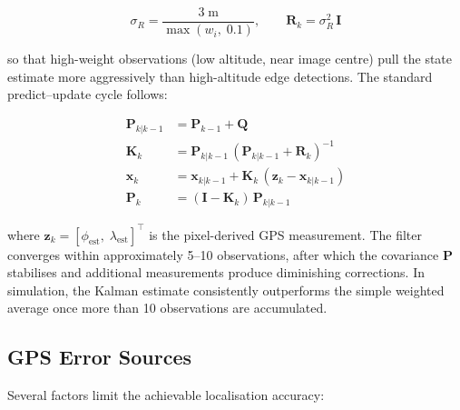 \begin{equation}\label{eq:kalman-R}
  \sigma_R = \frac{3\;\text{m}}{\max(w_i,\; 0.1)}, \qquad
  \mathbf{R}_k = \sigma_R^2\,\mathbf{I}
\end{equation}

\noindent so that high-weight observations (low altitude, near image centre) pull the state estimate more aggressively than high-altitude edge detections. The standard predict--update cycle follows:

\begin{align}
  \mathbf{P}_{k|k-1} &= \mathbf{P}_{k-1} + \mathbf{Q} \label{eq:kalman-predict}\\
  \mathbf{K}_k &= \mathbf{P}_{k|k-1}\,(\mathbf{P}_{k|k-1} + \mathbf{R}_k)^{-1} \label{eq:kalman-gain}\\
  \mathbf{x}_k &= \mathbf{x}_{k|k-1} + \mathbf{K}_k\,(\mathbf{z}_k - \mathbf{x}_{k|k-1}) \label{eq:kalman-update}\\
  \mathbf{P}_k &= (\mathbf{I} - \mathbf{K}_k)\,\mathbf{P}_{k|k-1} \label{eq:kalman-cov}
\end{align}

\noindent where $\mathbf{z}_k = [\phi_\mathrm{est},\;\lambda_\mathrm{est}]^\top$ is the pixel-derived GPS measurement. The filter converges within approximately 5--10 observations, after which the covariance $\mathbf{P}$ stabilises and additional measurements produce diminishing corrections. In simulation, the Kalman estimate consistently outperforms the simple weighted average once more than 10 observations are accumulated.

\subsection{GPS Error Sources}\label{sec:gps-error}

Several factors limit the achievable localisation accuracy:

